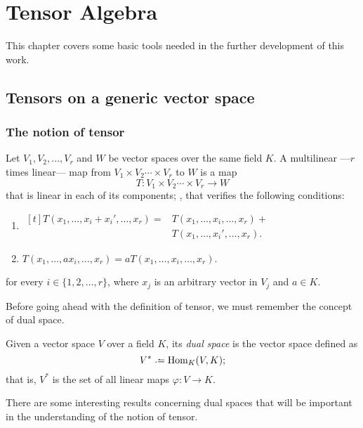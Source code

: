 \chapter{Tensor Algebra}

This chapter covers some basic tools needed in the further development of this work.

\section{Tensors on a generic vector space}

\subsection{The notion of tensor}

\begin{definition}
	\label{def:multilinear}
    Let $V_1, V_2, \dots, V_r$ and $W$ be vector spaces over the same field $K$. A multilinear ---$r$ times linear--- map from $V_1 \times V_2 \cdots \times V_r$ to $W$ is a map
    \[
        T \colon V_1 \times V_2 \cdots \times V_r \longrightarrow W
    \]
    that is linear in each of its components; \ie, that verifies the following conditions:
    \begin{enumerate}
        \item $\begin{aligned}[t]
	        T(x_1, \dots, x_i+x_i', \dots, x_r) = &T(x_1, \dots, x_i, \dots, x_r) + \\&T(x_1, \dots, x_i', \dots, x_r).
        \end{aligned}$
        \item $T(x_1, \dots, a x_i, \dots, x_r) = aT(x_1, \dots, x_i, \dots, x_r)$.
    \end{enumerate}
    for every $i \in \{1, 2, \dots, r\}$, where $x_j$ is an arbitrary vector in $V_j$ and $a \in K$.
\end{definition}

Before going ahead with the definition of tensor, we must remember the concept of dual space.

Given a vector space $V$ over a field $K$, its \emph{dual space} is the vector space defined as
\[
	V^* \defeq \Hom_K(V,K);
\]
that is, $V^*$ is the set of all linear maps $\varphi : V \to K$.

There are some interesting results concerning dual spaces that will be important in the understanding of the notion of tensor.

